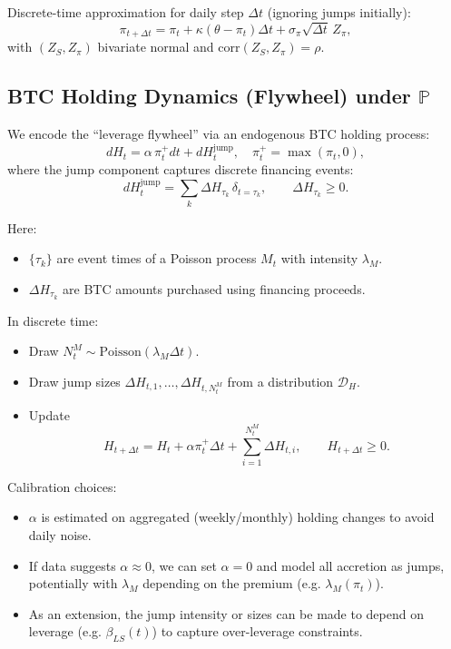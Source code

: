 \documentclass[11pt]{article}
\begin{document}
Discrete-time approximation for daily step $\Delta t$ (ignoring jumps initially):
$$
  \pi_{t+\Delta t}
  = \pi_t
    + \kappa(\theta - \pi_t) \Delta t
    + \sigma_\pi \sqrt{\Delta t}\,Z_\pi,
$$
with $(Z_S,Z_\pi)$ bivariate normal and $\text{corr}(Z_S,Z_\pi)=\rho$.

\subsection{BTC Holding Dynamics (Flywheel) under $\mathbb P$}

We encode the ``leverage flywheel'' via an endogenous BTC holding process:
$$
  dH_t = \alpha\,\pi_t^+ dt + dH_t^{\text{jump}},
  \quad \pi_t^+ = \max(\pi_t,0),
$$
where the jump component captures discrete financing events:
$$
  dH_t^{\text{jump}} = \sum_{k} \Delta H_{\tau_k}\,\delta_{t=\tau_k},
  \qquad \Delta H_{\tau_k} \ge 0.
$$

Here:
\begin{itemize}
  \item $\{\tau_k\}$ are event times of a Poisson process $M_t$ with intensity $\lambda_M$.
  \item $\Delta H_{\tau_k}$ are BTC amounts purchased using financing proceeds.
\end{itemize}

In discrete time:
\begin{itemize}
  \item Draw $N_t^M \sim \text{Poisson}(\lambda_M \Delta t)$.
  \item Draw jump sizes $\Delta H_{t,1},\dots,\Delta H_{t,N_t^M}$ from a distribution $\mathcal D_H$.
  \item Update
  $$
    H_{t+\Delta t}
    = H_t + \alpha \pi_t^+ \Delta t
          + \sum_{i=1}^{N_t^M} \Delta H_{t,i},
    \qquad H_{t+\Delta t} \ge 0.
  $$
\end{itemize}

Calibration choices:
\begin{itemize}
  \item $\alpha$ is estimated on aggregated (weekly/monthly) holding changes to avoid daily noise.
  \item If data suggests $\alpha \approx 0$, we can set $\alpha=0$ and model all accretion as jumps, potentially with $\lambda_M$ depending on the premium (e.g. $\lambda_M(\pi_t)$).
  \item As an extension, the jump intensity or sizes can be made to depend on leverage (e.g. $\beta_{LS}(t)$) to capture over-leverage constraints.
\end{itemize}
\end{document}
